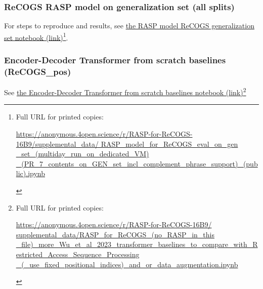\documentclass[11pt]{article}
\begin{document}
\subsubsection{ReCOGS RASP model on generalization set (all splits)}
For steps to reproduce and results, see \href{https://anonymous.4open.science/r/RASP-for-ReCOGS-16B9/supplemental\_data/RASP\_model\_for\_ReCOGS\_eval\_on\_gen\_set\_(multiday\_run\_on\_dedicated\_VM)\_(PR\_7\_contents\_on\_GEN\_set\_incl\_complement\_phrase\_support)\_(public).ipynb}{the RASP model ReCOGS generalization set notebook (link)}\footnote{\begin{footnotesize}Full URL for printed copies: 

\href{https://anonymous.4open.science/r/RASP-for-ReCOGS-16B9/supplemental\_data/RASP\_model\_for\_ReCOGS\_eval\_on\_gen\_set\_(multiday\_run\_on\_dedicated\_VM)\_(PR\_7\_contents\_on\_GEN\_set\_incl\_complement\_phrase\_support)\_(public).ipynb}{https://anonymous.4open.science/r/RASP-for-ReCOGS-16B9/supplemental\_data/
RASP\_model\_for\_ReCOGS\_eval\_on\_gen
\_set\_(multiday\_run\_on\_dedicated\_VM)
\_(PR\_7\_contents\_on\_GEN\_set\_incl\_complement\_phrase\_support)\_(public).ipynb}\end{footnotesize}}.

\subsubsection{\cite{Wu2023} Encoder-Decoder Transformer from scratch baselines (ReCOGS\_pos)}

See \href{https://anonymous.4open.science/r/RASP-for-ReCOGS-16B9/supplemental\_data/RASP\_for\_ReCOGS\_(no\_RASP\_in\_this\_file)\_more\_Wu\_et\_al\_2023\_transformer\_baselines\_to\_compare\_with\_Restricted\_Access\_Sequence\_Processing\_(\_use\_fixed\_positional\_indices)\_and\_or\_data\_augmentation.ipynb}{the Encoder-Decoder Transformer from scratch baselines notebook (link)}\footnote{\begin{footnotesize}Full URL for printed copies: 

\href{https://anonymous.4open.science/r/RASP-for-ReCOGS-16B9/supplemental\_data/RASP\_for\_ReCOGS\_(no\_RASP\_in\_this\_file)\_more\_Wu\_et\_al\_2023\_transformer\_baselines\_to\_compare\_with\_Restricted\_Access\_Sequence\_Processing\_(\_use\_fixed\_positional\_indices)\_and\_or\_data\_augmentation.ipynb}{https://anonymous.4open.science/r/RASP-for-ReCOGS-16B9/
supplemental\_data/RASP\_for\_ReCOGS\_(no\_RASP\_in\_this
\_file)\_more\_Wu\_et\_al\_2023\_transformer\_baselines\_to\_compare\_with\_Restricted\_Access\_Sequence\_Processing
\_(\_use\_fixed\_positional\_indices)\_and\_or\_data\_augmentation.ipynb}\end{footnotesize}}
\end{document}
